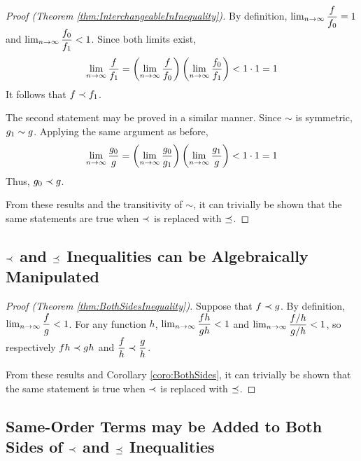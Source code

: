 \begin{proof}[Proof (Theorem \ref{thm:InterchangeableInInequality})]
	By definition, $\lim_{n \to \infty} \dfrac{f}{f_0} = 1$ and $\lim_{n \to \infty} \dfrac{f_0}{f_1} < 1$. Since both limits exist,
	\begin{align*}
	\lim_{n \to \infty} \frac{f}{f_1} = \left( \lim_{n \to \infty} \frac{f}{f_0} \right) \left( \lim_{n \to \infty} \frac{f_0}{f_1} \right) < 1 \cdot 1 = 1
	\end{align*}
	It follows that $f \prec f_1$.
	
	The second statement may be proved in a similar manner. Since $\sim$ is symmetric, $g_1 \sim g$. Applying the same argument as before,
	\begin{align*}
	\lim_{n \to \infty} \frac{g_0}{g} = \left( \lim_{n \to \infty} \frac{g_0}{g_1} \right) \left( \lim_{n \to \infty} \frac{g_1}{g} \right) < 1 \cdot 1 = 1
	\end{align*}
	Thus, $g_0 \prec g$.
	
	From these results and the transitivity of $\sim$, it can trivially be shown that the same statements are true when $\prec$ is replaced with $\preceq$.
\end{proof}

\subsection{$\prec$ and $\preceq$ Inequalities can be Algebraically Manipulated}

\begin{proof}[Proof (Theorem \ref{thm:BothSidesInequality})]
	Suppose that $f \prec g$. By definition, $\lim_{n \to \infty} \dfrac{f}{g} < 1$. For any function $h$, $\lim_{n \to \infty} \dfrac{fh}{gh} < 1$ and $\lim_{n \to \infty} \dfrac{f / h}{g / h} < 1$, so respectively $fh \prec gh$ and $\dfrac{f}{h} \prec \dfrac{g}{h}$.
	
	From these results and Corollary \ref{coro:BothSides}, it can trivially be shown that the same statement is true when $\prec$ is replaced with $\preceq$.
\end{proof}

\subsection{Same-Order Terms may be Added to Both Sides of $\prec$ and $\preceq$ Inequalities}

